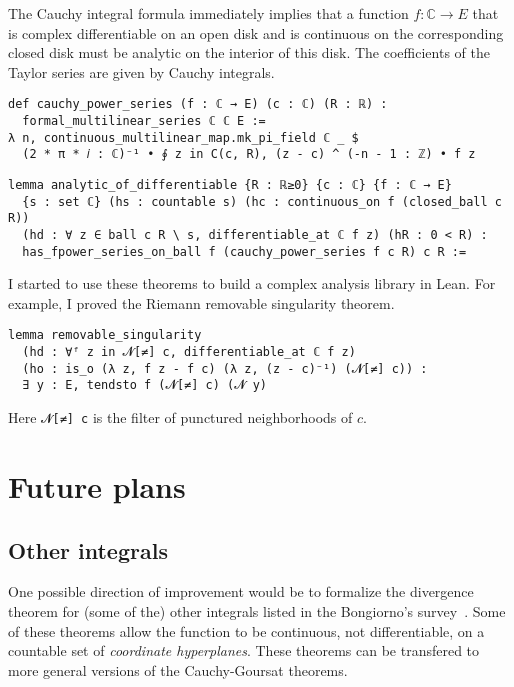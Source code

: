 \documentclass[a4paper, UKenglish,cleveref, autoref, thm-restate]{lipics-v2021}
\newcommand{\bbC}{\mathbb{C}}
\begin{document}
The Cauchy integral formula immediately implies that a function
\(f\colon\bbC\to E\) that is complex differentiable on an open disk
and is continuous on the corresponding closed disk must be analytic on
the interior of this disk. The coefficients of the Taylor series are
given by Cauchy integrals.

\begin{lstlisting}[caption=Power series for a function differentiable on a disk,label=lst:cauchy-series]
def cauchy_power_series (f : ℂ → E) (c : ℂ) (R : ℝ) :
  formal_multilinear_series ℂ ℂ E :=
λ n, continuous_multilinear_map.mk_pi_field ℂ _ $
  (2 * π * 𝑖 : ℂ)⁻¹ • ∮ z in C(c, R), (z - c) ^ (-n - 1 : ℤ) • f z
\end{lstlisting}

\begin{lstlisting}[caption=Analyticity of a complex differentiable function,label=lst:diff-analytic]
lemma analytic_of_differentiable {R : ℝ≥0} {c : ℂ} {f : ℂ → E}
  {s : set ℂ} (hs : countable s) (hc : continuous_on f (closed_ball c R))
  (hd : ∀ z ∈ ball c R \ s, differentiable_at ℂ f z) (hR : 0 < R) :
  has_fpower_series_on_ball f (cauchy_power_series f c R) c R :=
\end{lstlisting}

I started to use these theorems to build a complex analysis library in
Lean. For example, I proved the Riemann removable singularity theorem.

\begin{lstlisting}
lemma removable_singularity
  (hd : ∀ᶠ z in 𝓝[≠] c, differentiable_at ℂ f z)
  (ho : is_o (λ z, f z - f c) (λ z, (z - c)⁻¹) (𝓝[≠] c)) :
  ∃ y : E, tendsto f (𝓝[≠] c) (𝓝 y)
\end{lstlisting}

Here \lstinline{𝓝[≠] c} is the filter of punctured neighborhoods of
\(c\).

\section{Future plans}\label{sec:future-plans}

\subsection{Other integrals}\label{sec:other-integrals}

One possible direction of improvement would be to formalize the
divergence theorem for (some of the) other integrals listed in the
Bongiorno's survey~\cite{BONGIORNO2002587}. Some of these theorems
allow the function to be continuous, not differentiable, on a
countable set of \emph{coordinate hyperplanes}. These theorems can be
transfered to more general versions of the Cauchy-Goursat theorems.
\end{document}

